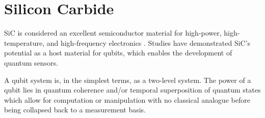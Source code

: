 \section{Silicon Carbide}\label{SiC}
SiC is considered an excellent semiconductor material for high-power, high-temperature, and high-frequency electronics \cite{Eddy2009,CASADY19961409}. Studies have demonstrated SiC's potential as a host material for qubits, which enables the development of quantum sensors. 

A qubit system is, in the simplest terms, as a two-level system. The power of a qubit lies in quantum coherence and/or
temporal superposition of quantum states which allow for computation or manipulation with no classical analogue before being collapsed back to a measurement basis. 


\cite{Eddy2009}


\cite{CASADY19961409}


\cite{10.1093/nsr/nwab122}


\cite{Son2021}

\cite{PhysRevApplied.6.034001}

\cite{Jiang2023}

\cite{Jiang2023}


